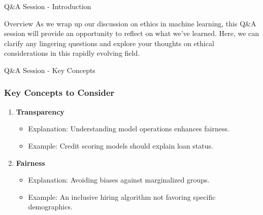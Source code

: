 \documentclass[aspectratio=169]{beamer}
\begin{document}
\begin{frame}[fragile]{Q\&A Session - Introduction}
  \begin{block}{Overview}
    As we wrap up our discussion on ethics in machine learning, this Q\&A session will provide an opportunity to reflect on what we've learned. Here, we can clarify any lingering questions and explore your thoughts on ethical considerations in this rapidly evolving field.
  \end{block}
\end{frame}

\begin{frame}[fragile]{Q\&A Session - Key Concepts}
  \frametitle{Key Concepts to Consider}
  \begin{enumerate}
    \item \textbf{Transparency}
      \begin{itemize}
        \item Explanation: Understanding model operations enhances fairness.
        \item Example: Credit scoring models should explain loan status.
      \end{itemize}

    \item \textbf{Fairness}
      \begin{itemize}
        \item Explanation: Avoiding biases against marginalized groups.
        \item Example: An inclusive hiring algorithm not favoring specific demographics.
      \end{itemize}
  \end{enumerate}
\end{frame}
\end{document}
